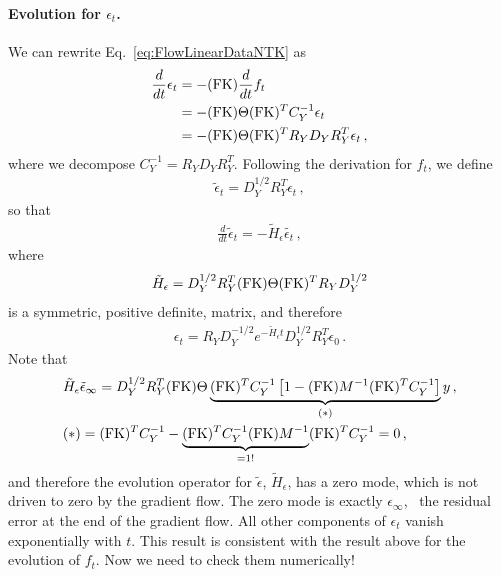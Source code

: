 \documentclass[11pt]{article}
\begin{document}
\paragraph{Evolution for $\epsilon_t$.}
We can rewrite Eq.~\ref{eq:FlowLinearDataNTK} as 
\begin{align}
    \label{eq:FlowLinearDataNTKEpsilon}
    \frac{d}{dt} \epsilon_t &= - (\mathrm{FK}) \frac{d}{dt} f_t \nonumber \\
        &= - (\mathrm{FK}) \Theta (\mathrm{FK})^T C_Y^{-1} \epsilon_t \nonumber \\
        &= - (\mathrm{FK}) \Theta (\mathrm{FK})^T R_Y D_Y R_Y^T \epsilon_t\, ,
\end{align}
where we decompose $C_Y^{-1}=R_Y D_Y R_Y^T$.
Following the derivation for $f_t$, we define
\begin{align}
    \label{eq:RotatedEps}
    \tilde{\epsilon}_t = D_Y^{1/2} R_Y^T \epsilon_t\, , 
\end{align}
so that 
\begin{align}
     \frac{d}{dt} \tilde{\epsilon}_t = 
        - \tilde{H}_\epsilon \tilde{\epsilon_t}\, ,
\end{align}
where 
\begin{align}
    \label{eq:HSymmetricDef}
    \tilde{H}_\epsilon  = D_Y^{1/2} R_Y^T (\mathrm{FK}) \Theta (\mathrm{FK})^T R_Y D_Y^{1/2}
\end{align}
is a symmetric, positive definite, matrix, and therefore
\begin{align}
    \label{eq:SolutionForEpsilon}
    \epsilon_t = R_Y D_Y^{-1/2} e^{-\tilde{H}_\epsilon t} D_Y^{1/2} R_Y^T \epsilon_0\, .
\end{align}
Note that 
\begin{align}
    & \tilde{H}_\epsilon \tilde{\epsilon}_\infty = 
        D_Y^{1/2} R_Y^T (\mathrm{FK}) \Theta 
        \underbrace{(\mathrm{FK})^T C_Y^{-1}
        \left[
            1 - (\mathrm{FK}) M^{-1} (\mathrm{FK})^T C_Y^{-1}
        \right]}_{(*)} y\, , \nonumber \\
    & (*) = (\mathrm{FK})^T C_Y^{-1} - \underbrace{(\mathrm{FK})^T C_Y^{-1} (\mathrm{FK}) M^{-1}}_{= 1!} 
        (\mathrm{FK})^T C_Y^{-1} = 0\, ,
    \label{eq:EpsilonZeroMode}
\end{align}
and therefore the evolution operator for $\tilde{\epsilon}$, $\tilde{H}_\epsilon$, has a zero mode, which is 
not driven to zero by the gradient flow. The zero mode is exactly $\epsilon_\infty$, \ie\ the residual error 
at the end of the gradient flow. All other components of $\epsilon_t$ vanish exponentially with $t$.
This result is consistent with the result above for the evolution of $f_t$. Now we need to 
check them numerically! 
\end{document}
